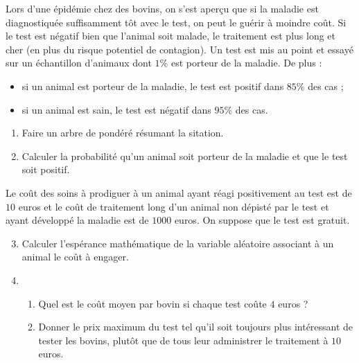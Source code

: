 \documentclass[11pt]{article}
\begin{document}
\begin{exo}[$4$ points]
  Lors d'une épidémie chez des bovins, on s'est aperçu que si la maladie est
  diagnostiquée suffisamment tôt avec le test, on peut le guérir à moindre coût.
  Si le test est négatif bien que l'animal soit malade, le traitement est plus
  long et cher (en plus du risque potentiel de contagion). Un test est mis au
  point et essayé sur un échantillon d'animaux dont $1$\% est porteur de la
  maladie. De plus :
  \begin{itemize}
    \item si un animal est porteur de la maladie, le test est positif dans
      $85$\% des cas ;
    \item si un animal est sain, le test est négatif dans $95$\% des cas.
  \end{itemize}
  \begin{enumerate}
    \item Faire un arbre de pondéré résumant la sitation.
    \item Calculer la probabilité qu'un animal soit porteur de la maladie et que
      le test soit positif.
  \end{enumerate}
  Le coût des soins à prodiguer à un animal ayant réagi positivement au test est
  de $10$ euros et le coût de traitement long d'un animal non dépisté par le
  test et ayant développé la maladie est de $1000$ euros. On suppose que le test
  est gratuit.
  \begin{enumerate}
      \setcounter{enumi}{2}
    \item Calculer l'espérance mathématique de la variable aléatoire associant
      à un animal le coût à engager.
    \item \begin{enumerate}
        \item Quel est le coût moyen par bovin si chaque test coûte $4$ euros ?
        \item Donner le prix maximum du test tel qu'il soit toujours plus
          intéressant de tester les bovins, plutôt que de tous leur administrer
          le traitement à $10$ euros.
      \end{enumerate}
  \end{enumerate}
\end{exo}
\end{document}
